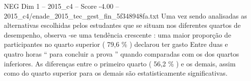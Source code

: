 \begin{textsample}{NEG Dim 1 – 2015\_c4 – Score -4.00 – 2015\_c4/enade\_2015\_tec\_gest\_fin\_5f348948fa.txt}
Uma vez sendo analisadas as alternativas escolhidas pelos estudantes que se situam nos diferentes quartos de desempenho, observa -se uma tendência crescente : uma maior proporção de participantes no quarto superior ( 79,6 \% ) declarou ter gasto Entre duas e quatro horas “ para concluir a prova ” quando comparadas com os dos quartos inferiores.
As diferenças entre o primeiro quarto ( 56,2 \% ) e os demais, assim como do quarto superior para os demais são estatisticamente significativas.

\end{textsample}
